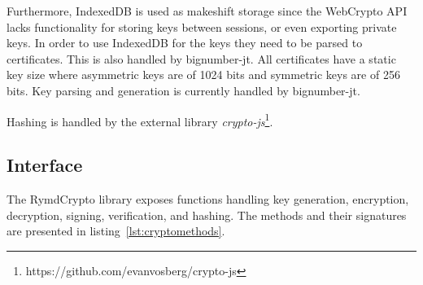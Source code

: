 Furthermore, IndexedDB is used as makeshift storage since the WebCrypto API lacks functionality for storing keys between sessions, or even exporting private keys. In order to use IndexedDB for the keys they need to be parsed to certificates. This is also handled by bignumber-jt. All certificates have a static key size where asymmetric keys are of 1024 bits and symmetric keys are of 256 bits. Key parsing and generation is currently handled by bignumber-jt.

Hashing is handled by the external library \emph{crypto-js}\footnote{https://github.com/evanvosberg/crypto-js}.

\subsection{Interface}

The RymdCrypto library exposes functions handling key generation, encryption, decryption, signing, verification, and hashing. The methods and their signatures are presented in listing~\ref{lst:cryptomethods}.

